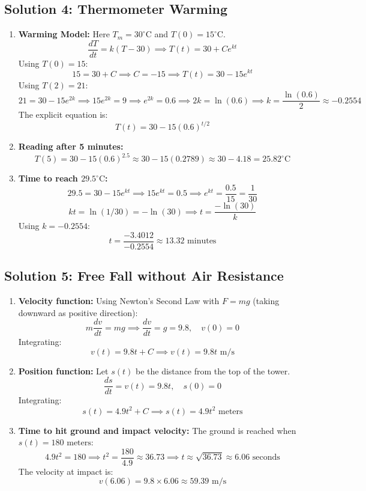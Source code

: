 \documentclass[11pt,letterpaper]{article}
\begin{document}
\subsection*{Solution 4: Thermometer Warming}
\begin{enumerate}[label=(\alph*)]
    \item \textbf{Warming Model:}
    Here $T_m = 30^\circ\text{C}$ and $T(0) = 15^\circ\text{C}$.
    \[ \frac{dT}{dt} = k(T-30) \implies T(t) = 30 + C e^{kt} \]
    Using $T(0) = 15$:
    \[ 15 = 30 + C \implies C = -15 \implies T(t) = 30 - 15 e^{kt} \]
    Using $T(2) = 21$:
    \[ 21 = 30 - 15 e^{2k} \implies 15 e^{2k} = 9 \implies e^{2k} = 0.6 \implies 2k = \ln(0.6) \implies k = \frac{\ln(0.6)}{2} \approx -0.2554 \]
    The explicit equation is:
    \[ T(t) = 30 - 15 (0.6)^{t/2} \]

    \item \textbf{Reading after 5 minutes:}
    \[ T(5) = 30 - 15 (0.6)^{2.5} \approx 30 - 15 (0.2789) \approx 30 - 4.18 = 25.82^\circ\text{C} \]

    \item \textbf{Time to reach $29.5^\circ\text{C}$:}
    \[ 29.5 = 30 - 15 e^{kt} \implies 15 e^{kt} = 0.5 \implies e^{kt} = \frac{0.5}{15} = \frac{1}{30} \]
    \[ kt = \ln(1/30) = -\ln(30) \implies t = \frac{-\ln(30)}{k} \]
    Using $k = -0.2554$:
    \[ t = \frac{-3.4012}{-0.2554} \approx 13.32 \text{ minutes} \]
\end{enumerate}

\subsection*{Solution 5: Free Fall without Air Resistance}
\begin{enumerate}[label=(\alph*)]
    \item \textbf{Velocity function:}
    Using Newton's Second Law with $F = mg$ (taking downward as positive direction):
    \[ m \frac{dv}{dt} = mg \implies \frac{dv}{dt} = g = 9.8, \quad v(0) = 0 \]
    Integrating:
    \[ v(t) = 9.8t + C \implies v(t) = 9.8t \text{ m/s} \]

    \item \textbf{Position function:}
    Let $s(t)$ be the distance from the top of the tower.
    \[ \frac{ds}{dt} = v(t) = 9.8t, \quad s(0) = 0 \]
    Integrating:
    \[ s(t) = 4.9t^2 + C \implies s(t) = 4.9t^2 \text{ meters} \]

    \item \textbf{Time to hit ground and impact velocity:}
    The ground is reached when $s(t) = 180\text{ meters}$:
    \[ 4.9t^2 = 180 \implies t^2 = \frac{180}{4.9} \approx 36.73 \implies t \approx \sqrt{36.73} \approx 6.06 \text{ seconds} \]
    The velocity at impact is:
    \[ v(6.06) = 9.8 \times 6.06 \approx 59.39 \text{ m/s} \]
\end{enumerate}
\end{document}
